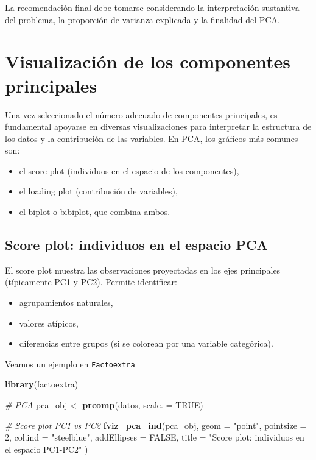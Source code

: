 \documentclass[
]{book}
\newenvironment{Shaded}{\begin{snugshade}}{\end{snugshade}}
\newcommand{\AttributeTok}[1]{\textcolor[rgb]{0.13,0.29,0.53}{#1}}
\newcommand{\CommentTok}[1]{\textcolor[rgb]{0.56,0.35,0.01}{\textit{#1}}}
\newcommand{\ConstantTok}[1]{\textcolor[rgb]{0.56,0.35,0.01}{#1}}
\newcommand{\DecValTok}[1]{\textcolor[rgb]{0.00,0.00,0.81}{#1}}
\newcommand{\FunctionTok}[1]{\textcolor[rgb]{0.13,0.29,0.53}{\textbf{#1}}}
\newcommand{\NormalTok}[1]{#1}
\newcommand{\OtherTok}[1]{\textcolor[rgb]{0.56,0.35,0.01}{#1}}
\newcommand{\StringTok}[1]{\textcolor[rgb]{0.31,0.60,0.02}{#1}}
\begin{document}
La recomendación final debe tomarse considerando la interpretación sustantiva del problema, la proporción de varianza explicada y la finalidad del PCA.

\section{Visualización de los componentes principales}\label{visualizaciuxf3n-de-los-componentes-principales}

Una vez seleccionado el número adecuado de componentes principales, es fundamental apoyarse en diversas visualizaciones para interpretar la estructura de los datos y la contribución de las variables. En PCA, los gráficos más comunes son:

\begin{itemize}
\item
  el score plot (individuos en el espacio de los componentes),
\item
  el loading plot (contribución de variables),
\item
  el biplot o bibiplot, que combina ambos.
\end{itemize}

\subsection{Score plot: individuos en el espacio PCA}\label{score-plot-individuos-en-el-espacio-pca}

El score plot muestra las observaciones proyectadas en los ejes principales (típicamente PC1 y PC2). Permite identificar:

\begin{itemize}
\item
  agrupamientos naturales,
\item
  valores atípicos,
\item
  diferencias entre grupos (si se colorean por una variable categórica).
\end{itemize}

Veamos un ejemplo en \texttt{Factoextra}

\begin{Shaded}
\begin{Highlighting}[]
\FunctionTok{library}\NormalTok{(factoextra)}

\CommentTok{\# PCA}
\NormalTok{pca\_obj }\OtherTok{\textless{}{-}} \FunctionTok{prcomp}\NormalTok{(datos, }\AttributeTok{scale. =} \ConstantTok{TRUE}\NormalTok{)}

\CommentTok{\# Score plot PC1 vs PC2}
\FunctionTok{fviz\_pca\_ind}\NormalTok{(pca\_obj,}
             \AttributeTok{geom =} \StringTok{"point"}\NormalTok{,}
             \AttributeTok{pointsize =} \DecValTok{2}\NormalTok{,}
             \AttributeTok{col.ind =} \StringTok{"steelblue"}\NormalTok{,}
             \AttributeTok{addEllipses =} \ConstantTok{FALSE}\NormalTok{,}
             \AttributeTok{title =} \StringTok{"Score plot: individuos en el espacio PC1{-}PC2"}
\NormalTok{             )}
\end{Highlighting}
\end{Shaded}
\end{document}
